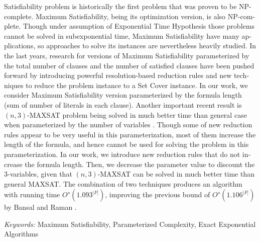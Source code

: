 \begin{otherlanguage}{english}
 Satisfiability problem is historically the first problem that was proven to be NP-complete. Maximum Satisfiability, being its optimization version, is also NP-complete. Though under assumption of Exponential Time Hypothesis those problems cannot be solved in subexponential time, Maximum Satisfiability have many applications, so approaches to solve its instances are nevertheless heavily studied. In the last years, research for versions of Maximum Satisfiability parameterized by the total number of clauses and the number of satisfied clauses have been pushed forward by introducing powerful resolution-based reduction rules and new techniques to reduce the problem instance to a Set Cover instance. In our work, we consider Maximum Satisfiability version parameterized by the formula length (sum of number of literals in each clause). Another important recent result is $(n,3)$-MAXSAT problem being solved in much better time than general case when parameterized by the number of variables \cite{belova18}. Though some of new reduction rules appear to be very useful in this parameterization, most of them increase the length of the formula, and hence cannot be used for solving the problem in this parameterization. In our work, we introduce new reduction rules that do not increase the formula length. Then, we decrease the parameter value to discount the 3-variables, given that $(n,3)$-MAXSAT can be solved in much better time than general MAXSAT. The combination of two techniques produces an algorithm with running time $O^∗(1.093^{|F|})$, improving the previous bound of $O^∗(1.106^{|F|})$ by Bansal and Raman \cite{bansal99}. 

\vspace{14pt}

\textit{Keywords:} Maximum Satisfiability, Parameterized Complexity, Exact Exponential Algorithms
\end{otherlanguage}


